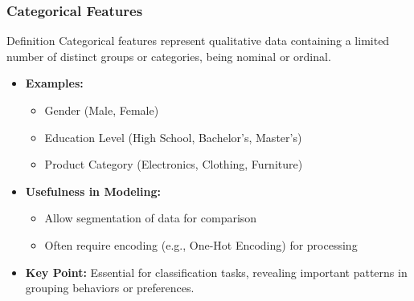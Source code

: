 \documentclass[aspectratio=169]{beamer}
\begin{document}
\begin{frame}
    \frametitle{Categorical Features}
    \begin{block}{Definition}
        Categorical features represent qualitative data containing a limited number of distinct groups or categories, being nominal or ordinal.
    \end{block}
    \begin{itemize}
        \item \textbf{Examples:}
            \begin{itemize}
                \item Gender (Male, Female)
                \item Education Level (High School, Bachelor's, Master's)
                \item Product Category (Electronics, Clothing, Furniture)
            \end{itemize}
        \item \textbf{Usefulness in Modeling:}
            \begin{itemize}
                \item Allow segmentation of data for comparison
                \item Often require encoding (e.g., One-Hot Encoding) for processing
            \end{itemize}
        \item \textbf{Key Point:} 
            Essential for classification tasks, revealing important patterns in grouping behaviors or preferences.
    \end{itemize}
\end{frame}
\end{document}
